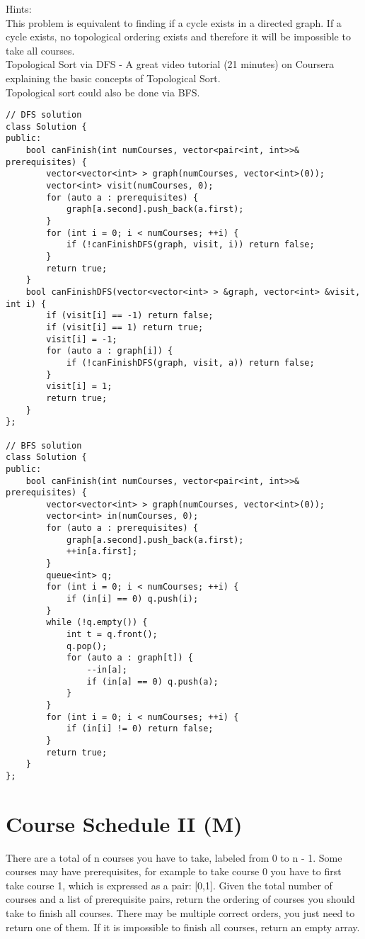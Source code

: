 Hints:\\
    This problem is equivalent to finding if a cycle exists in a directed graph. If a cycle exists, no topological ordering exists and therefore it will be impossible to take all courses.\\
    Topological Sort via DFS - A great video tutorial (21 minutes) on Coursera explaining the basic concepts of Topological Sort.\\
    Topological sort could also be done via BFS.\\

\begin{lstlisting}
// DFS solution
class Solution {
public:
    bool canFinish(int numCourses, vector<pair<int, int>>& prerequisites) {
        vector<vector<int> > graph(numCourses, vector<int>(0));
        vector<int> visit(numCourses, 0);
        for (auto a : prerequisites) {
            graph[a.second].push_back(a.first);
        }
        for (int i = 0; i < numCourses; ++i) {
            if (!canFinishDFS(graph, visit, i)) return false;
        }
        return true;
    }
    bool canFinishDFS(vector<vector<int> > &graph, vector<int> &visit, int i) {
        if (visit[i] == -1) return false;
        if (visit[i] == 1) return true;
        visit[i] = -1;
        for (auto a : graph[i]) {
            if (!canFinishDFS(graph, visit, a)) return false;
        }
        visit[i] = 1;
        return true;
    }
};

// BFS solution
class Solution {
public:
    bool canFinish(int numCourses, vector<pair<int, int>>& prerequisites) {
        vector<vector<int> > graph(numCourses, vector<int>(0));
        vector<int> in(numCourses, 0);
        for (auto a : prerequisites) {
            graph[a.second].push_back(a.first);
            ++in[a.first];
        }
        queue<int> q;
        for (int i = 0; i < numCourses; ++i) {
            if (in[i] == 0) q.push(i);
        }
        while (!q.empty()) {
            int t = q.front();
            q.pop();
            for (auto a : graph[t]) {
                --in[a];
                if (in[a] == 0) q.push(a);
            }
        }
        for (int i = 0; i < numCourses; ++i) {
            if (in[i] != 0) return false;
        }
        return true;
    }
};
\end{lstlisting}

\section{Course Schedule II (M)}
There are a total of n courses you have to take, labeled from 0 to n - 1. Some courses may have prerequisites, for example to take course 0 you have to first take course 1, which is expressed as a pair: [0,1]. Given the total number of courses and a list of prerequisite pairs, return the ordering of courses you should take to finish all courses. There may be multiple correct orders, you just need to return one of them. If it is impossible to finish all courses, return an empty array.\\

